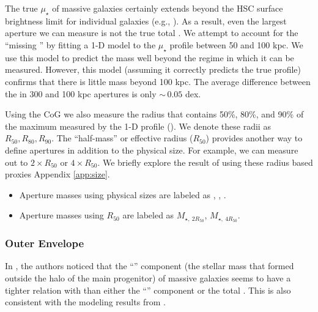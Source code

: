 \documentclass[fleqn,usenatbib,useAMS,english]{mnras}
\begin{document}
    The true $\mu_{\star}$ of massive galaxies certainly extends beyond the HSC surface
    brightness limit for individual galaxies (e.g., \citealt{Wang2019, Zhang2019, Montes2021,
    Kluge2021}). As a result, even the largest aperture \mstar{} we can measure is not the true total \mstar{}.
    We attempt to account for the ``missing \mstar{}'' by fitting a 1-D \ser{} model to the
    $\mu_{\star}$ profile between 50 and 100 kpc. We use this model to predict the mass well beyond
    the regime in which it can be measured.
    However, this model (assuming it correctly predicts the true profile) confirms that
    there is little mass beyond 100 kpc.
    The average difference between the \mstar{} in 300 and 100 kpc apertures is only $\sim\,0.05$ dex.

    Using the CoG we also measure the radius that contains 50\%, 80\%, and 90\% of the maximum
    \mstar{} measured by the 1-D profile (\mmax{}).
    We denote these radii as $R_{50}, R_{80}, R_{90}$.
    The ``half-mass'' or effective radius ($R_{50}$) provides another way to define apertures
    in addition to the physical size.
    For example, we can measure \mstar{} out to $2\times R_{50}$ or $4\times R_{50}$.
    We briefly explore the result of using these radius based proxies Appendix
    \ref{app:size}.

    \begin{itemize}
        \item Aperture masses using physical sizes are labeled as , ,
        .

        \item Aperture masses using $R_{50}$ are labeled as $M_{\star,\ 2R_{50}}$, $M_{\star,\
           4R_{50}}$.
    \end{itemize}

\subsubsection{Outer Envelope \mstar{}}
    \label{sec:menvelope}

    In \citet{Bradshaw2020}, the authors noticed that the ``\exsitu{}'' component
    (the stellar mass that formed outside the halo of the main progenitor)
    of massive galaxies seems to have a tighter relation with \mvir{} than either the ``\insitu{}'' component
    or the total \mstar{}.
    This is also consistent with the modeling results from \citet{Huang2020}.
\end{document}
